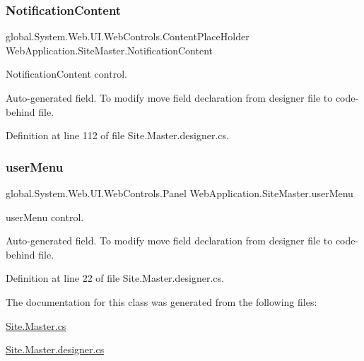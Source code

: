\mbox{\label{classWebApplication_1_1SiteMaster_ac0d3975658a8839098c53e1f37c8f1a5}} 
\subsubsection{\texorpdfstring{NotificationContent}{NotificationContent}}
{\footnotesize\ttfamily global.\+System.\+Web.\+U\+I.\+Web\+Controls.\+Content\+Place\+Holder Web\+Application.\+Site\+Master.\+Notification\+Content\hspace{0.3cm}{\ttfamily [protected]}}



Notification\+Content control. 

Auto-\/generated field. To modify move field declaration from designer file to code-\/behind file. 

Definition at line 112 of file Site.\+Master.\+designer.\+cs.

\mbox{\label{classWebApplication_1_1SiteMaster_a0c71f5770925f8c600ac941c4f258dec}} 
\subsubsection{\texorpdfstring{userMenu}{userMenu}}
{\footnotesize\ttfamily global.\+System.\+Web.\+U\+I.\+Web\+Controls.\+Panel Web\+Application.\+Site\+Master.\+user\+Menu\hspace{0.3cm}{\ttfamily [protected]}}



user\+Menu control. 

Auto-\/generated field. To modify move field declaration from designer file to code-\/behind file. 

Definition at line 22 of file Site.\+Master.\+designer.\+cs.



The documentation for this class was generated from the following files\+:\begin{DoxyCompactItemize}
\item 
\mbox{\hyperlink{Site_8Master_8cs}{Site.\+Master.\+cs}}\item 
\mbox{\hyperlink{Site_8Master_8designer_8cs}{Site.\+Master.\+designer.\+cs}}\end{DoxyCompactItemize}
